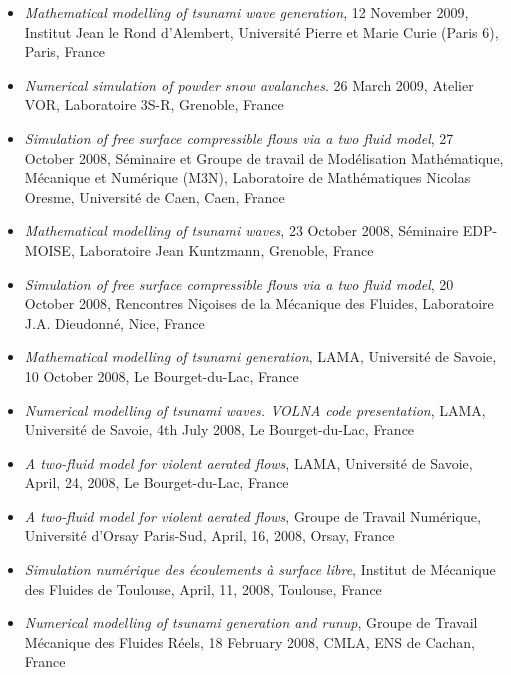 \documentclass[final, a4paper, oneside, 12pt]{article}
\numberwithin{equation}{section}
\begin{document}
\begin{itemize}
  \item \textit{Mathematical modelling of tsunami wave generation}, 12 November 2009, Institut Jean le Rond d'Alembert, Universit\'e Pierre et Marie Curie (Paris 6), Paris, France
  
  \item \textit{Numerical simulation of powder snow avalanches}. 26 March 2009, Atelier VOR, Laboratoire 3S-R, Grenoble, France
  
  \item \textit{Simulation of free surface compressible flows via a two fluid model}, 27 October 2008, S\'eminaire et Groupe de travail de Mod\'elisation Math\'ematique, M\'ecanique et Num\'erique (M3N), Laboratoire de Math\'ematiques Nicolas Oresme, Universit\'e de Caen, Caen, France
  
  \item \textit{Mathematical modelling of tsunami waves}, 23 October 2008, S\'eminaire EDP-MOISE, Laboratoire Jean Kuntzmann, Grenoble, France
  
  \item \textit{Simulation of free surface compressible flows via a two fluid model}, 20 October 2008, Rencontres Ni\c{c}oises de la M\'ecanique des Fluides, Laboratoire J.A. Dieudonn\'e, Nice, France
  
  \item \textit{Mathematical modelling of tsunami generation}, LAMA, Universit\'e de Savoie, 10 October 2008, Le Bourget-du-Lac, France
  
  \item \textit{Numerical modelling of tsunami waves. VOLNA code presentation}, LAMA, Universit\'e de Savoie, 4th July 2008, Le Bourget-du-Lac, France
  
  \item \textit{A two-fluid model for violent aerated flows}, LAMA, Universit\'e de Savoie, April, 24, 2008, Le Bourget-du-Lac, France
  
  \item \textit{A two-fluid model for violent aerated flows}, Groupe de Travail Num\'erique, Universit\'e d'Orsay Paris-Sud, April, 16, 2008, Orsay, France
  
  \item \textit{Simulation num\'erique des \'ecoulements \`a surface libre}, Institut de M\'ecanique des Fluides de Toulouse, April, 11, 2008, Toulouse, France
  
  \item \textit{Numerical modelling of tsunami generation and runup}, Groupe de Travail M\'ecanique des Fluides R\'eels, 18 February 2008, CMLA, ENS de Cachan, France
  

\end{itemize}
\end{document}
